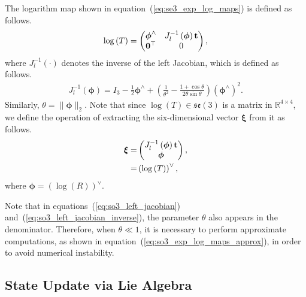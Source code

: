 The logarithm map shown in equation~(\ref{eq:se3_exp_log_maps}) is defined as follows.
%
\begin{align}
  \log \left( T \right) = \left( \begin{matrix}
    \boldsymbol \phi^{\wedge} & J_{l}^{-1} \left( \boldsymbol \phi \right) {\bf t} \\
    {\bf 0}^{\top}            & 0
  \end{matrix} \right),
  \label{eq:se3_log_map}
\end{align}
%
where $J_{l}^{-1}(\cdot)$ denotes the inverse of the left Jacobian, which is defined as follows.
%
\begin{align}
  J_{l}^{-1} \left( \boldsymbol \phi \right)
  =
  I_{3} -
  \frac{1}{2} \boldsymbol \phi^{\wedge} + 
  \left( \frac{1}{ \theta^{2} } - \frac{ 1 + \cos \theta }{ 2 \theta \sin \theta } \right) \left( \boldsymbol \phi^{\wedge} \right)^{2}.
  \label{eq:so3_left_jacobian_inverse}
\end{align}
%
Similarly, $\theta = \| \boldsymbol{\phi} \|_{2}$.
Note that since $\log(T) \in \mathfrak{se}(3)$ is a matrix in $\mathbb{R}^{4 \times 4}$, we define the operation of extracting the six-dimensional vector $\boldsymbol{\xi}$ from it as follows.
%
\begin{align}
  \begin{split}
    \boldsymbol \xi
%
    = & \left( \begin{matrix}
      J_{l}^{-1} \left( \boldsymbol \phi \right) {\bf t} \\
      \boldsymbol \phi
    \end{matrix} \right), \\
%
    = & \left( \log \left( T \right) \right)^{\vee},
  \end{split}
\end{align}
%
where $\boldsymbol{\phi} = \left( \log(R) \right)^{\vee}$.

Note that in equations~(\ref{eq:so3_left_jacobian}) and~(\ref{eq:so3_left_jacobian_inverse}), the parameter $\theta$ also appears in the denominator.
Therefore, when $\theta \ll 1$, it is necessary to perform approximate computations, as shown in equation~(\ref{eq:so3_exp_log_maps_approx}), in order to avoid numerical instability.











\subsection{State Update via Lie Algebra}

